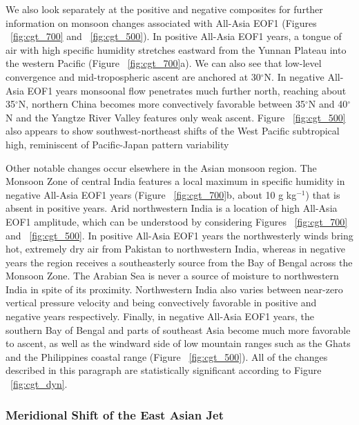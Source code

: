 	We also look separately at the positive and negative composites for further information on monsoon changes associated with All-Asia EOF1 (Figures ~\ref{fig:cgt_700} and ~\ref{fig:cgt_500}). In positive All-Asia EOF1 years, a tongue of air with high specific humidity stretches eastward from the Yunnan Plateau into the western Pacific (Figure  ~\ref{fig:cgt_700}a). We can also see that low-level convergence and mid-tropospheric ascent are anchored at 30$^{\circ}$N. In negative All-Asia EOF1 years monsoonal flow penetrates much further north, reaching about 35$^{\circ}$N, northern China becomes more convectively favorable between 35$^{\circ}$N and 40$^{\circ}$N and the Yangtze River Valley features only weak ascent. Figure  ~\ref{fig:cgt_500} also appears to show southwest-northeast shifts of the West Pacific subtropical high, reminiscent of Pacific-Japan pattern variability \citep{Kosaka2011}
	
	Other notable changes occur elsewhere in the Asian monsoon region. The Monsoon Zone of central India features a local maximum in specific humidity in negative All-Asia EOF1 years (Figure  ~\ref{fig:cgt_700}b, about 10 g kg$^{-1}$) that is absent in positive years. Arid northwestern India is a location of high All-Asia EOF1 amplitude, which can be understood by considering Figures ~\ref{fig:cgt_700} and ~\ref{fig:cgt_500}. In positive All-Asia EOF1 years the northwesterly winds bring hot, extremely dry air from Pakistan to northwestern India, whereas in negative years the region receives a southeasterly source from the Bay of Bengal across the Monsoon Zone. The Arabian Sea is never a source of moisture to northwestern India in spite of its proximity. Northwestern India also varies between near-zero vertical pressure velocity and being convectively favorable in positive and negative years respectively. Finally, in negative All-Asia EOF1 years, the southern Bay of Bengal and parts of southeast Asia become much more favorable to ascent, as well as the windward side of low mountain ranges such as the Ghats and the Philippines coastal range (Figure ~\ref{fig:cgt_500}). All of the changes described in this paragraph are statistically significant according to Figure  ~\ref{fig:cgt_dyn}.
	
\subsubsection{Meridional Shift of the East Asian Jet}

